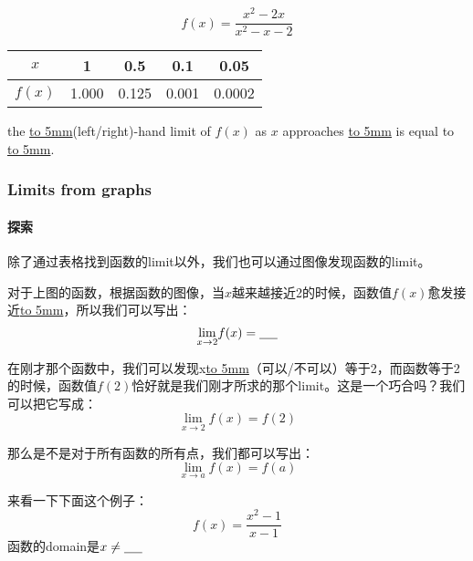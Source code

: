 \documentclass[UTF8]{ctexart}
\begin{document}
\[f(x) = \frac{x^2-2x}{x^2-x-2}\]
\begin{center}
\begin{tabular}{c|c|c|c|c}
\hline
$x$  & 1 & 0.5 & 0.1& 0.05 \\
\hline
$f(x)$ & 1.000 & 0.125 & 0.001 & 0.0002\\
\hline
\end{tabular}
\end{center}
the \underline{\hbox to 5mm{}}(left/right)-hand limit of $f(x)$ as $x$ approaches \underline{\hbox to 5mm{}} is equal to \underline{\hbox to 5mm{}}.

\subsubsection{Limits from graphs}
\paragraph{探索}
除了通过表格找到函数的limit以外，我们也可以通过图像发现函数的limit。

\begin{center}
\end{center}


对于上图的函数，根据函数的图像，当$x$越来越接近2的时候，函数值$f(x)$愈发接近\underline{\hbox to 5mm{}}，所以我们可以写出：\[{\lim_{x\to 2}} f(x) = \underline{\hbox to 5mm{}}\]

在刚才那个函数中，我们可以发现x\underline{\hbox to 5mm{}}（可以/不可以）等于2，而函数等于2的时候，函数值$f(2)$恰好就是我们刚才所求的那个limit。这是一个巧合吗？我们可以把它写成：\[{\lim_{x\to 2}} f(x) = f(2)\]

那么是不是对于所有函数的所有点，我们都可以写出：\[{\lim_{x\to a}} f(x) = f(a)\]

来看一下下面这个例子：
\[f(x) =  \frac{x^2-1}{x-1}\]
函数的domain是$x\not= \underline{\hbox to 5mm{}}$

\begin{center}
\end{center}
\end{document}
